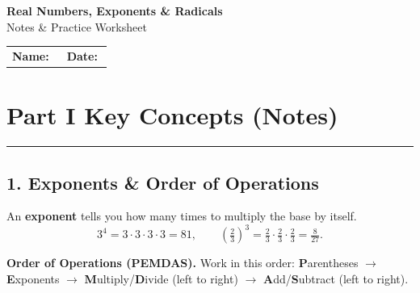 \documentclass[11pt]{article}
\begin{document}
\begin{center}
  {\color{fangblue}\Huge\bfseries Real Numbers, Exponents \& Radicals}\\[6pt]
  {\color{fangmid}\large Notes \& Practice Worksheet}\\[10pt]
\end{center}

\vspace{4pt}
\begin{center}
\begin{tabular}{@{}p{0.5\linewidth}p{0.42\linewidth}@{}}
\textbf{\color{fangblue}Name:} \underline{\hspace{5cm}} &
\textbf{\color{fangblue}Date:} \underline{\hspace{4cm}}
\end{tabular}
\end{center}

\vspace{10pt}

\section*{Part I \; \textbullet\; Key Concepts (Notes)}
{\color{fangblue}\rule{\linewidth}{0.8pt}}

\subsection*{1.\; Exponents \& Order of Operations}

An \textbf{exponent} tells you how many times to multiply the base by itself.
\[
3^{4}=3\cdot3\cdot3\cdot3 = 81,
\qquad
\left(\tfrac{2}{3}\right)^{3}=\tfrac{2}{3}\cdot\tfrac{2}{3}\cdot\tfrac{2}{3}=\tfrac{8}{27}.
\]

\begin{conceptbox}
\textbf{\color{fangblue}Order of Operations (PEMDAS).}
Work in this order:
\textbf{P}arentheses $\rightarrow$ \textbf{E}xponents $\rightarrow$
\textbf{M}ultiply/\textbf{D}ivide (left to right) $\rightarrow$
\textbf{A}dd/\textbf{S}ubtract (left to right).
\end{conceptbox}
\end{document}
